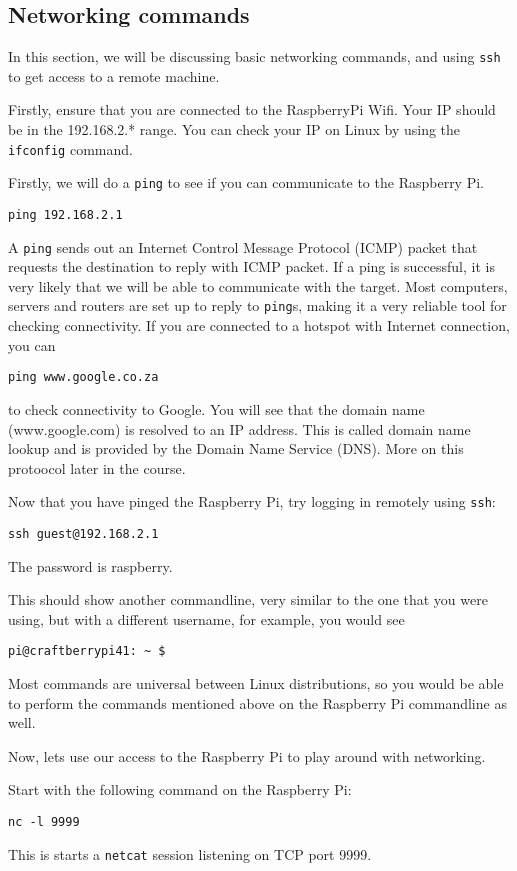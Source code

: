 \documentclass[a4paper]{article}
\begin{document}
\subsection{Networking commands}
In this section, we will be discussing basic networking commands, and using \texttt{ssh} to get access to a remote machine. 

Firstly, ensure that you are connected to the RaspberryPi Wifi. Your IP should be in the 192.168.2.* range. You can check your IP on Linux by using the \texttt{ifconfig} command. 

Firstly, we will do a \texttt{ping} to see if you can communicate to the Raspberry Pi. 
\begin{lstlisting}
ping 192.168.2.1
\end{lstlisting}
A \texttt{ping} sends out an Internet Control Message Protocol (ICMP) packet that requests the destination to reply with ICMP packet. If a ping is successful, it is very likely that we will be able to communicate with the target. Most computers, servers and routers are set up to reply to \texttt{ping}s, making it a very reliable tool for checking connectivity. If you are connected to a hotspot with Internet connection, you can
\begin{lstlisting}
ping www.google.co.za
\end{lstlisting}
to check connectivity to Google. You will see that the domain name (www.google.com) is resolved to an IP address. This is called domain name lookup and is provided by the Domain Name Service (DNS). More on this protoocol later in the course. 

Now that you have pinged the Raspberry Pi, try logging in remotely using \texttt{ssh}:
\begin{lstlisting}
ssh guest@192.168.2.1
\end{lstlisting}
The password is raspberry.

This should show another commandline, very similar to the one that you were using, but with a different username, for example, you would see 
\begin{lstlisting}
pi@craftberrypi41: ~ $
\end{lstlisting}
Most commands are universal between Linux distributions, so you would be able to perform the commands mentioned above on the Raspberry Pi commandline as well. 

Now, lets use our access to the Raspberry Pi to play around with networking. 

Start with the following command on the Raspberry Pi: 
\begin{lstlisting}
nc -l 9999
\end{lstlisting}
This is starts a \texttt{netcat} session listening on TCP port 9999. 
\end{document}
